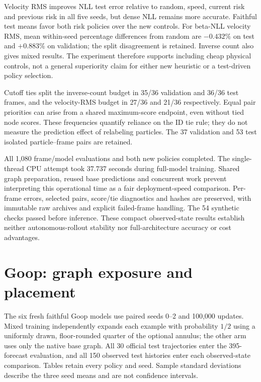 Velocity RMS improves NLL test error relative to random, speed, current risk
and previous risk in all five seeds, but dense NLL remains more accurate.
Faithful test means favor both risk policies over the new controls. For
beta-NLL velocity RMS, mean within-seed percentage differences from random
are $-0.432\%$ on test and $+0.883\%$ on validation; the split disagreement
is retained. Inverse count also gives mixed results. The experiment therefore
supports including cheap physical controls, not a general superiority claim
for either new heuristic or a test-driven policy selection.

Cutoff ties split the inverse-count budget in 35/36 validation and 36/36 test
frames, and the velocity-RMS budget in 27/36 and 21/36 respectively. Equal
pair priorities can arise from a shared maximum-score endpoint, even without
tied node scores. These frequencies quantify reliance on the ID tie rule;
they do not measure the prediction effect of relabeling particles. The 37
validation and 53 test isolated particle--frame pairs are retained.

All 1,080 frame/model evaluations and both new policies completed. The
single-thread CPU attempt took 37.737 seconds during full-model training.
Shared graph preparation, reused base predictions and concurrent work prevent
interpreting this operational time as a fair deployment-speed comparison.
Per-frame errors, selected pairs, score/tie diagnostics and hashes are
preserved, with immutable raw archives and explicit failed-frame handling.
The 54 synthetic checks passed before inference. These compact observed-state
results establish neither autonomous-rollout stability nor full-architecture
accuracy or cost advantages.


\clearpage
\section{Goop: graph exposure and placement}
\label{sec:goop-graph-exposure}
The six fresh faithful Goop models use paired seeds 0--2 and 100,000 updates. Mixed training independently expands each example with probability $1/2$ using a uniformly drawn, floor-rounded quarter of the optional annulus; the other arm uses only the native base graph. All 30 official test trajectories enter the 395-forecast evaluation, and all 150 observed test histories enter each observed-state comparison. Tables retain every policy and seed. Sample standard deviations describe the three seed means and are not confidence intervals.


